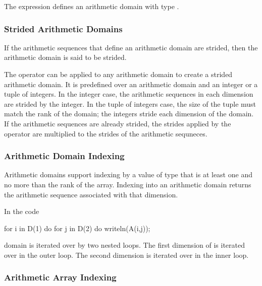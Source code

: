\begin{example}
The expression \chpl{[1..5, 1..5]} defines an arithmetic domain with
type .
\end{example}

\subsubsection{Strided Arithmetic Domains}
\label{Strided_Arithmetic_Domains_and_Arrays}

If the arithmetic sequences that define an arithmetic domain are
strided, then the arithmetic domain is said to be strided.

The  operator can be applied to any arithmetic domain to
create a strided arithmetic domain.  It is predefined over an
arithmetic domain and an integer or a tuple of integers.  In the
integer case, the arithmetic sequences in each dimension are strided
by the integer.  In the tuple of integers case, the size of the tuple
must match the rank of the domain; the integers stride each dimension
of the domain.  If the arithmetic sequences are already strided, the
strides applied by the  operator are multiplied to the
strides of the arithmetic sequneces.

\subsubsection{Arithmetic Domain Indexing}
\label{Arithmetic_Domain_Indexing}

Arithmetic domains support indexing by a value of type  that
is at least one and no more than the rank of the array.  Indexing into
an arithmetic domain returns the arithmetic sequence associated with
that dimension.

\begin{example}
In the code
\begin{chapel}
for i in D(1) do
  for j in D(2) do
    writeln(A(i,j));
\end{chapel}
domain  is iterated over by two nested loops.  The first
dimension of  is iterated over in the outer loop.  The second
dimension is iterated over in the inner loop.
\end{example}

\subsubsection{Arithmetic Array Indexing}
\label{Arithmetic_Array_Indexing}

